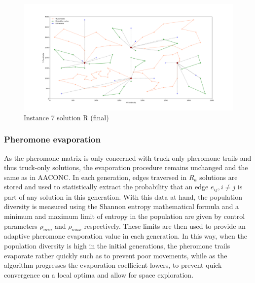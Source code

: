 \documentclass{article}
\begin{document}
	\begin{figure}[h]
		\centering
		\begin{minipage}{\columnwidth}
			\centering
			\includegraphics[scale=0.2]{p07-15-15-15_best_solution}\;
			\caption{Instance 7 solution R (final)}
			\label{fig:R_solution}
		\end{minipage}
	\end{figure}
	\subsubsection{Pheromone evaporation}
	As the pheromone matrix is only concerned with truck-only pheromone trails and thus truck-only solutions, the evaporation procedure remains unchanged and the same as in AACONC. In each generation, edges traversed in $R_a$ solutions are stored and used to statistically extract the probability that an edge $e_{ij},i\neq j$ is part of any solution in this generation. With this data at hand, the population diversity is measured using the Shannon entropy mathematical formula and a minimum and maximum limit of entropy in the population are given by control parameters $\rho_{min}$ and $\rho_{max}$ respectively. These limits are then used to provide an adaptive pheromone evaporation value in each generation. In this way, when the population diversity is high in the initial generations, the pheromone trails evaporate rather quickly such as to prevent poor movements, while as the algorithm progresses the evaporation coefficient lowers, to prevent quick convergence on a local optima and allow for space exploration.
	\par 
\end{document}
